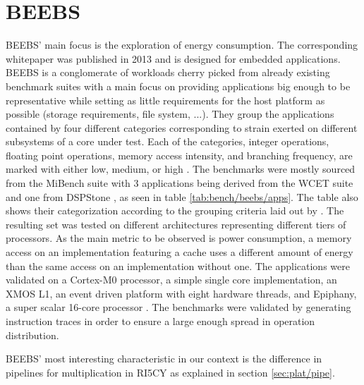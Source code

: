 \documentclass[../bachelor_paper.tex]{subfiles}
\begin{document}
\section{BEEBS}
    \label{sec:bench:beebs}
BEEBS' main focus is the exploration of energy consumption. The corresponding whitepaper was published in 2013 and is designed for embedded applications. BEEBS is a conglomerate of workloads cherry picked from already existing benchmark suites with a main focus on providing applications big enough to be representative while setting as little requirements for the host platform as possible (storage requirements, file system, ...). They group the applications contained by four different categories corresponding to strain exerted on different subsystems of a core under test. Each of the categories, integer operations, floating point operations, memory access intensity, and branching frequency, are marked with either low, medium, or high \cite{pallisterBEEBSOpenBenchmarks2013}. The benchmarks were mostly sourced from the MiBench suite \cite{guthausMiBenchFreeCommercially2001} with 3 applications being derived from the WCET suite \cite{gustafssonMalardalenWCETBenchmarks2010} and one from DSPStone \cite{zivojnovicDSPstoneDSPorientedBenchmarking1994}, as seen in table \ref{tab:bench/beebs/apps}. The table also shows their categorization according to the grouping criteria laid out by \cite{pallisterBEEBSOpenBenchmarks2013}. The resulting set was tested on different architectures representing different tiers of processors. As the main metric to be observed is power consumption, a memory access on an implementation featuring a cache uses a different amount of energy than the same access on an implementation without one. The applications were validated on a Cortex-M0 processor, a simple single core implementation, an XMOS L1, an event driven platform with eight hardware threads, and Epiphany, a super scalar 16-core processor \cite{pallisterBEEBSOpenBenchmarks2013}. The benchmarks were validated by generating instruction traces in order to ensure a large enough spread in operation distribution.

BEEBS' most interesting characteristic in our context is the difference in pipelines for multiplication in RI5CY as explained in section \ref{sec:plat/pipe}. 
\end{document}
